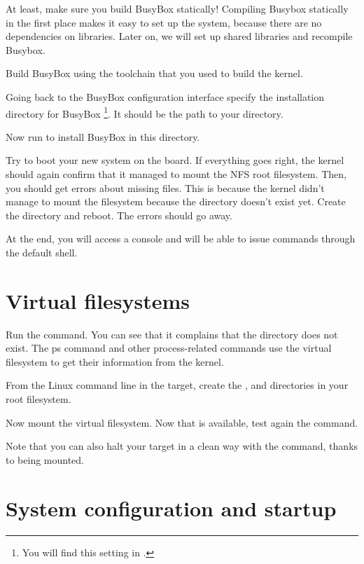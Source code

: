 At least, make sure you build BusyBox statically! Compiling Busybox
statically in the first place makes it easy to set up the system,
because there are no dependencies on libraries. Later on, we will set
up shared libraries and recompile Busybox.

Build BusyBox using the toolchain that you used to build the kernel.

Going back to the BusyBox configuration interface
specify the installation directory for BusyBox
\footnote{You will find this setting in
.}.
It should be the path to your  directory.

Now run  to install BusyBox in this directory.

Try to boot your new system on the board. If everything goes right,
the kernel should again confirm that it managed to mount the NFS root
filesystem. Then, you should get errors about missing 
files. This is because the kernel didn't manage to mount the
 filesystem because the  directory doesn't
exist yet. Create the  directory and reboot. The errors should
go away. 

At the end, you will access a console and will be able to issue
commands through the default shell.

\section{Virtual filesystems}

Run the  command. You can see that it complains that the
 directory does not exist. The ps command and other
process-related commands use the  virtual filesystem to get
their information from the kernel.

From the Linux command line in the target, create the ,  and
 directories in your root filesystem.

Now mount the  virtual filesystem. Now that  is
available, test again the  command.

Note that you can also halt your target in a clean way with the 
command, thanks to  being mounted.

\section{System configuration and startup}

